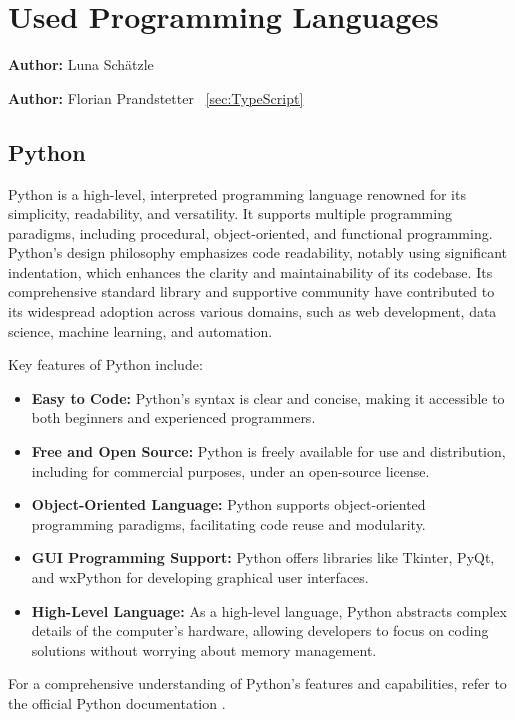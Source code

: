 
\chapter{Used Programming Languages}
\label{chap:used_programming_languages}
\textbf{Author:} Luna Schätzle

\textbf{Author:} Florian Prandstetter ~\ref{sec:TypeScript}


\section{Python}

Python is a high-level, interpreted programming language renowned for its simplicity, readability, and versatility. It supports multiple programming paradigms, including procedural, object-oriented, and functional programming. Python's design philosophy emphasizes code readability, notably using significant indentation, which enhances the clarity and maintainability of its codebase. Its comprehensive standard library and supportive community have contributed to its widespread adoption across various domains, such as web development, data science, machine learning, and automation.

Key features of Python include:

\begin{itemize}
    \item \textbf{Easy to Code:} Python's syntax is clear and concise, making it accessible to both beginners and experienced programmers.
    \item \textbf{Free and Open Source:} Python is freely available for use and distribution, including for commercial purposes, under an open-source license.
    \item \textbf{Object-Oriented Language:} Python supports object-oriented programming paradigms, facilitating code reuse and modularity.
    \item \textbf{GUI Programming Support:} Python offers libraries like Tkinter, PyQt, and wxPython for developing graphical user interfaces.
    \item \textbf{High-Level Language:} As a high-level language, Python abstracts complex details of the computer's hardware, allowing developers to focus on coding solutions without worrying about memory management.
\end{itemize}

For a comprehensive understanding of Python's features and capabilities, refer to the official Python documentation \cite{python-intro-w3schools}.

